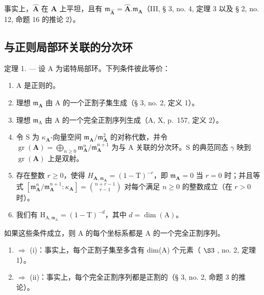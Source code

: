 事实上，\(\hat{\mathbf{A}}\) 在 \(\mathbf{A}\) 上平坦，且有 \(\mathfrak{m}_{\hat{\mathbf{A}}} = \hat{\mathbf{A}}. \mathfrak{m}_{\mathbf{A}}\)（III, § 3, no. 4, 定理 3 以及 § 2, no. 12, 命题 16 的推论 2）。

\subsection{与正则局部环关联的分次环}

定理 1. --- 设 A 为诺特局部环。下列条件彼此等价：

\begin{enumerate}
\def\labelenumi{(\roman{enumi})}
\item
  A 是正则的。
\item
  理想 \(\mathfrak{m}_{\mathbf{A}}\) 由 A 的一个正割子集生成（§ 3, no. 2, 定义 1）。
\item
  理想 \(\mathfrak{m}_{\mathrm{A}}\) 由 A 的一个完全正割序列生成（A, X, p.~157, 定义 2）。
\item
  令 S 为 \(\kappa_{\mathbf{A}}\)-向量空间 \(\mathfrak{m}_{\mathbf{A}} / \mathfrak{m}_{\mathbf{A}}^{2}\) 的对称代数，并令 \(\operatorname{gr}(\mathbf{A}) = \bigoplus_{n \geqslant 0} \mathfrak{m}_{\mathbf{A}}^{n} / \mathfrak{m}_{\mathbf{A}}^{n+1}\) 为与 A 关联的分次环。S 的典范同态 \(\gamma\) 映到 \(\operatorname{gr}(\mathbf{A})\) 上是双射。
\item
  存在整数 \(r \geqslant 0\)，使得 \(H_{\mathbf{A},\mathfrak{m}_{\mathbf{A}}} = (1 - \mathrm{T})^{-r}\)，即 \(\mathfrak{m}_{\mathbf{A}} = 0\) 当 \(r = 0\) 时；并且等式 \([\mathfrak{m}_{\mathbf{A}}^{n}/\mathfrak{m}_{\mathbf{A}}^{n+1}:\kappa_{\mathbf{A}}] = \binom{n + r - 1}{r - 1}\) 对每个满足 \(n \geqslant 0\) 的整数成立（在 \(r > 0\) 时）。
\item
  我们有 \(\mathrm{H}_{\mathrm{A},\mathfrak{m}_{\mathrm{A}}} = (1 - \mathrm{T})^{-d}\)，其中 \(d = \dim (\mathrm{A})\)。
\end{enumerate}

如果这些条件成立，则 A 的每个坐标系都是 A 的一个完全正割序列。

\begin{enumerate}
\def\labelenumi{(\roman{enumi})}
\setcounter{enumi}{1}
\item
  \(\Rightarrow\) (i)：事实上，每个正割子集至多含有 dim(A) 个元素（ \(\S 3\) , no. 2, 定理 1）。
\item
  \(\Rightarrow\) (ii)：事实上，每个完全正割序列都是正割的（§ 3, no. 2, 命题 3 的推论）。
\end{enumerate}


